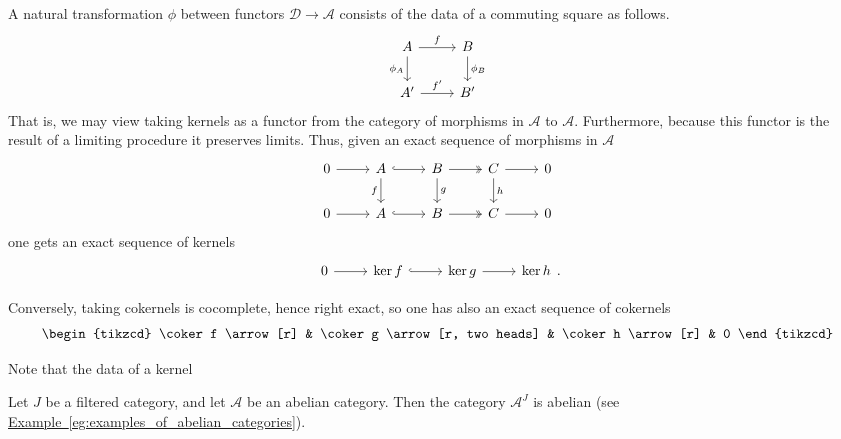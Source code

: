 \documentclass[main.tex]{subfiles}
\begin{document}
\begin{example}
  A natural transformation $\phi$ between functors $\mathcal{D} \to \mathcal{A}$ consists of the data of a commuting square as follows.
  \begin{equation*}
    \begin{tikzcd}
      A
      \arrow[r, "f"]
      \arrow[d, swap, "\phi_{A}"]
      & B
      \arrow[d, "\phi_{B}"]
      \\
      A'
      \arrow[r, "f'"]
      & B'
    \end{tikzcd}
  \end{equation*}
  That is, we may view taking kernels as a functor from the category of morphisms in $\mathcal{A}$ to $\mathcal{A}$. Furthermore, because this functor is the result of a limiting procedure it preserves limits. Thus, given an exact sequence of morphisms in $\mathcal{A}$
  \begin{equation*}
    \begin{tikzcd}
      0
      \arrow[r]
      & A
      \arrow[r, hook]
      \arrow[d, swap, "f"]
      & B
      \arrow[r, two heads]
      \arrow[d, "g"]
      & C
      \arrow[r]
      \arrow[d, "h"]
      & 0
      \\
      0
      \arrow[r]
      & A
      \arrow[r, hook]
      & B
      \arrow[r, two heads]
      & C
      \arrow[r]
      & 0
    \end{tikzcd}
  \end{equation*}
  one gets an exact sequence of kernels
  \begin{equation*}
    \begin{tikzcd}
      0
      \arrow[r]
      & \ker f
      \arrow[r, hook]
      & \ker g
      \arrow[r]
      & \ker h
    \end{tikzcd}.
  \end{equation*}

  Conversely, taking cokernels is cocomplete, hence right exact, so one has also an exact sequence of cokernels
  \begin{equation*}
    \begin{tikzcd}
      \coker f
      \arrow[r]
      & \coker g
      \arrow[r, two heads]
      & \coker h
      \arrow[r]
      & 0
    \end{tikzcd}
  \end{equation*}

  Note that the data of a kernel 
\end{example}

\begin{example}
  Let $J$ be a filtered category, and let $\mathcal{A}$ be an abelian category. Then the category $\mathcal{A}^{J}$ is abelian (see \hyperref[eg:examples_of_abelian_categories]{Example~\ref*{eg:examples_of_abelian_categories}}).
\end{example}
\end{document}
